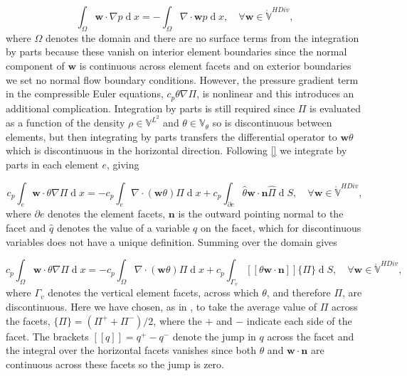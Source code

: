 \documentclass[journal abbreviation, manuscript]{copernicus}
\def\MM#1{\boldsymbol{#1}}
\DeclareMathOperator{\diff}{d}
\newcommand{\avg}[1]{\{#1\}}
\newcommand{\jump}[1]{[\![#1]\!]}
\begin{document}
\begin{equation}
\int_\Omega\MM{w}\cdot\nabla p \diff x = -\int_\Omega\nabla\cdot\MM{w}p\diff x, \quad \forall \MM{w} \in \ring{\mathbb{V}}^{HDiv},
\end{equation}
where $\Omega$ denotes the domain and there are no surface terms from
the integration by parts because these vanish on interior element
boundaries since the normal component of $\MM{w}$ is continuous across
element facets and on exterior boundaries we set no normal flow
boundary conditions. However, the pressure gradient term in the
compressible Euler equations, $c_p\theta\nabla\Pi$, is nonlinear and
this introduces an additional complication. Integration by parts is
still required since $\Pi$ is evaluated as a function of the density
$\rho \in \mathbb{V}^{L^2}$ and $\theta \in \mathbb{V}_\theta$ so is
discontinuous between elements, but then integrating by parts
transfers the differential operator to $\MM{w}\theta$ which is
discontinuous in the horizontal direction. Following \ref{} we integrate by parts
in each element $e$, giving

\begin{equation}
  c_p\int_e\MM{w}\cdot\theta\nabla\Pi\diff x = -c_p\int_e\nabla\cdot(\MM{w}\theta)\Pi\diff x + c_p\int_{\partial e}\hat{\theta}\MM{w}\cdot\MM{n}\hat{\Pi}\diff S, \quad \forall \MM{w} \in \ring{\mathbb{V}}^{HDiv},
\end{equation}
where $\partial e$ denotes the element facets, $\MM{n}$ is the outward
pointing normal to the facet and $\hat{q}$ denotes the value of a
variable $q$ on the facet, which for discontinuous variables does not
have a unique definition. Summing over the domain gives

\begin{equation}
  c_p\int_\Omega\MM{w}\cdot\theta\nabla\Pi\diff x = -c_p\int_\Omega\nabla\cdot(\MM{w}\theta)\Pi\diff x + c_p\int_{\Gamma_v}\jump{\theta\MM{w}\cdot\MM{n}}\avg{\Pi} \diff S, \quad \forall \MM{w} \in \ring{\mathbb{V}}^{HDiv},
\end{equation}
where $\Gamma_v$ denotes the vertical element facets, across which
$\theta$, and therefore $\Pi$, are discontinuous. Here we have chosen,
as in \citet{}, to take the average value of $\Pi$ across the facets,
$\avg{\Pi} = (\Pi^++\Pi^-)/2$, where the $+$ and $-$ indicate each
side of the facet. The brackets $\jump{q} = q^+-q^-$ denote the jump
in $q$ across the facet and the integral over the horizontal facets
vanishes since both $\theta$ and $\MM{w}\cdot\MM{n}$ are continuous
across these facets so the jump is zero.
\end{document}
